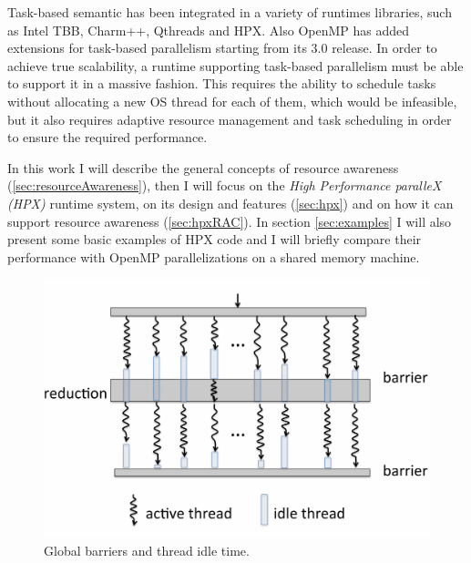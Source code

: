 
Task-based semantic has been integrated in a variety of runtimes libraries, such as Intel TBB\cite{contreras2008characterizing}, Charm++\cite{charmpp}, Qthreads\cite{qthreads} and HPX\cite{heller2017hpx}. Also OpenMP has added extensions for task-based parallelism starting from its 3.0 release\cite{omp30}.
In order to achieve true scalability, a runtime supporting task-based parallelism must be able to support it in a massive fashion. This requires the ability to schedule tasks without allocating a new OS thread for each of them, which would be infeasible, but it also requires adaptive resource management and task scheduling in order to ensure the required performance.

In this work I will describe the general concepts of resource awareness (\ref{sec:resourceAwareness}), then I will focus on the \emph{High Performance paralleX (HPX)} runtime system, on its design and features (\ref{sec:hpx}) and on how it can support resource awareness (\ref{sec:hpxRAC}).
In section \ref{sec:examples} I will also present 
some basic examples of HPX code and I will briefly compare their performance with OpenMP parallelizations on a shared memory machine.

\begin{figure}[t]
 	\begin{center}
 		\includegraphics[scale=0.09]{Figures/globalBarriersAndThreadIdleTime.png}
 		\caption{Global barriers and thread idle time\cite{grubel2016dynamic}.}\label{fig:globalBarriers}
 	\end{center}
\end{figure}

